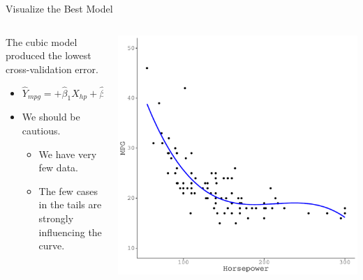 \documentclass{beamer}\usepackage[]{graphicx}\usepackage[]{color}
\makeatletter
\def\maxwidth{ %
  \ifdim\Gin@nat@width>\linewidth
    \linewidth
  \else
    \Gin@nat@width
  \fi
}
\newenvironment{knitrout}{}{} %
\makeatother
\begin{document}
\begin{frame}{Visualize the Best Model}
  
  \begin{columns}
    \begin{column}{0.5\textwidth}
      
      The cubic model produced the lowest cross-validation error.
      \vc
      \begin{itemize}
      \item $\hat{Y}_{mpg} = +\hat{\beta}_1 X_{hp} + \hat{\beta}_2 X_{hp}^2 + \hat{\beta}_3 X_{hp}^3$
      \item We should be cautious.
        \vc
        \begin{itemize}
        \item We have very few data.
          \vc
        \item The few cases in the tails are strongly influencing the curve.
        \end{itemize}
      \end{itemize}
      
    \end{column}
    
    \begin{column}{0.5\textwidth}
      
\begin{knitrout}\footnotesize
{}\color{fgcolor}

{\centering \includegraphics[width=\maxwidth]{figure/unnamed-chunk-40-1} 

}



\end{knitrout}

\end{column}
\end{columns}

\end{frame}
\end{document}
